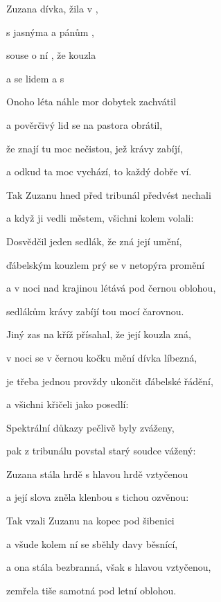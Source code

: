 

\zs
Zuzana  dívka,  žila v ,

s jasnýma  a  pánům ,

souse o ní , že  kouzla 

a  se lidem  a s   
\ks

\zs
Onoho léta náhle mor dobytek zachvátil

a pověrčivý lid se na pastora obrátil,

že znají tu moc nečistou, jež krávy zabíjí,

a odkud ta moc vychází, to každý dobře ví.
\ks

\zs
Tak Zuzanu hned před tribunál předvést nechali

a když ji vedli městem, všichni kolem volali:

\ks

\zs
Dosvědčil jeden sedlák, že zná její umění,

ďábelským kouzlem prý se v netopýra promění

a v noci nad krajinou létává pod černou oblohou,

sedlákům krávy zabíjí tou mocí čarovnou.
\ks

\zs
Jiný zas na kříž přísahal, že její kouzla zná,

v noci se v černou kočku mění dívka líbezná,

je třeba jednou provždy ukončit ďábelské řádění,

a všichni křičeli jako posedlí: 
\ks

\zs
Spektrální důkazy pečlivě byly zváženy,

pak z tribunálu povstal starý soudce vážený:

\ks

\zs
Zuzana stála hrdě s hlavou hrdě vztyčenou

a její slova zněla klenbou s tichou ozvěnou:

\ks

\zs
Tak vzali Zuzanu na kopec pod šibenici

a všude kolem ní se sběhly davy běsnící,

a ona stála bezbranná, však s hlavou vztyčenou,

zemřela tiše samotná pod letní oblohou.
\ks

\kp

